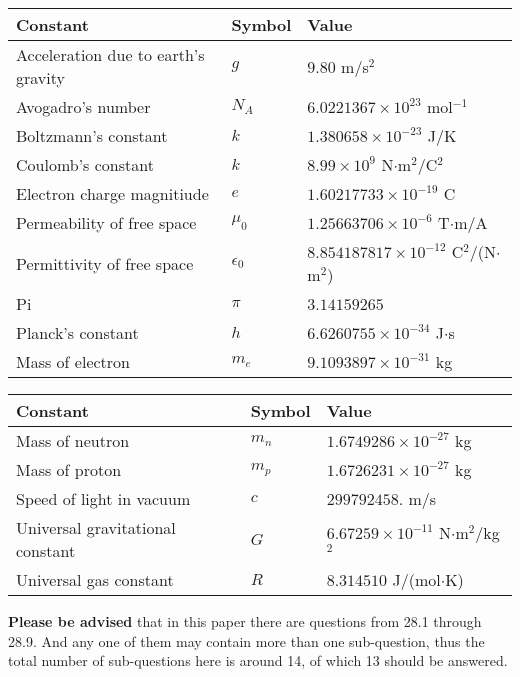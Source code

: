 \documentclass[12pt]{article}
\begin{document}
\noindent\begin{tabular}{|l|l|l|}
\hline
Constant & Symbol & Value \\
\hline
Acceleration due to earth's gravity &
$g$ &
 $ 9.80 $
m/s$^2$ \\
\hline
Avogadro's number &
$N_A$ &
 $ 6.0221367 \times 10^{23} $
mol$^{-1}$ \\
\hline
Boltzmann's constant &
$k$ &
 $ 1.380658 \times 10^{-23} $
J/K \\
\hline
Coulomb's constant &
$k$ &
 $ 8.99 \times 10^{9} $
N$\cdot $m$^2$/C$^2$ \\
\hline
Electron charge magnitiude &
$e$ &
 $ 1.60217733 \times 10^{-19} $
C \\
\hline
Permeability of free space &
$\mu _0$ &
 $ 1.25663706 \times 10^{-6} $
T$\cdot $m/A \\
\hline
Permittivity of free space &
$\epsilon _0$ &
 $ 8.854187817 \times 10^{-12} $
C$^2$/(N$\cdot $m$^2$) \\
\hline
Pi &
$\pi$ &
 $ 3.14159265 $
$ $ \\
\hline
Planck's constant &
$h$ &
 $ 6.6260755 \times 10^{-34} $
J$\cdot $s \\
\hline
Mass of electron &
$m_e$ &
 $ 9.1093897 \times 10^{-31} $
kg \\
\hline
\end{tabular}
 
 
\noindent\begin{tabular}{|l|l|l|}
\hline
Constant & Symbol & Value \\
\hline
Mass of neutron &
$m_n$ &
 $ 1.6749286 \times 10^{-27} $
kg \\
\hline
Mass of proton &
$m_p$ &
 $ 1.6726231 \times 10^{-27} $
kg \\
\hline
Speed of light in vacuum &
$c$ &
 $ 299792458. $
m/s \\
\hline
Universal gravitational constant &
$G$ &
 $ 6.67259 \times 10^{-11} $
N$\cdot $m$^2$/kg$^2$ \\
\hline
Universal gas constant &
$R$ &
 $ 8.314510 $
J/(mol$\cdot $K) \\
\hline
\end{tabular}
 
 
{\textbf{\large{Please be advised}}} that in this paper there are questions from
28.1 through
28.9.
And any one of them may contain more than one sub-question, thus the total number
of sub-questions here is around 14, of which
13 should be answered.
 
\vspace{0.3in}
 
\end{document}
